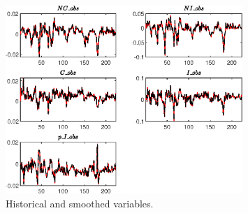  
\begin{figure}[H]
\centering 
\includegraphics[width=0.80\textwidth]{BRS_growth_util_sectoral/graphs/BRS_growth_util_sectoral_HistoricalAndSmoothedVariables1}
\caption{Historical and smoothed variables.}\label{Fig:HistoricalAndSmoothedVariables:1}
\end{figure}


